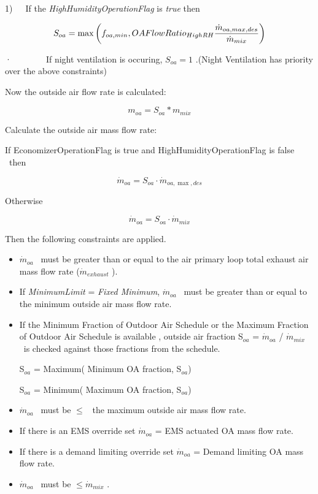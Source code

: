 1)~~~If the \emph{HighHumidityOperationFlag} is \emph{true} then

\begin{equation}
  S_{oa} = \max\PB{f_{oa,min},OAFlowRatio_{HighRH}\frac{\dot{m}_{oa,max,des}}{\dot{m}_{mix}}}
\end{equation}

·~~~~~~~~If night ventilation is occuring, \({S_{oa}} = 1\) .(Night Ventilation has priority over the above constraints)

Now the outside air flow rate is calculated:

\begin{equation}
{m_{oa}} = {S_{oa}}*{m_{mix}}
\end{equation}

Calculate the outside air mass flow rate:

If EconomizerOperationFlag is true and HighHumidityOperationFlag is false ~then

\begin{equation}
{\dot m_{oa}} = {S_{oa}}\cdot {\dot m_{oa,\max ,des}}
\end{equation}

Otherwise

\begin{equation}
{\dot m_{oa}} = {S_{oa}}\cdot {\dot m_{mix}}
\end{equation}

Then the following constraints are applied.

\begin{itemize}
\item  \({\dot m_{oa}}\) ~must be greater than or equal to the air primary loop total exhaust air mass flow rate (\({\dot m_{exhaust}}\) ).

\item  If \emph{MinimumLimit} = \emph{Fixed Minimum}, \({\dot m_{oa}}\) ~must be greater than or equal to the minimum outside air mass flow rate.

\item  If the Minimum Fraction of Outdoor Air Schedule or the Maximum Fraction of Outdoor Air Schedule is available , outside air fraction S\(_{oa}\) = \({\dot m_{oa}}\) / \({\dot m_{mix}}\) ~is checked against those fractions from the schedule.

S\(_{oa}\) = Maximum( Minimum OA fraction, S\(_{oa}\))

S\(_{oa}\) = Minimum( Maximum OA fraction, S\(_{oa}\))

\item  \({\dot m_{oa}}\) ~must be \(\le\) ~the maximum outside air mass flow rate.

\item  If there is an EMS override set \({\dot m_{oa}}\) = EMS actuated OA mass flow rate.

\item  If there is a demand limiting override set \({\dot m_{oa}}\) = Demand limiting OA mass flow rate.

\item  \({\dot m_{oa}}\) ~must be \(\le {\dot m_{mix}}\) .

\end{itemize}

